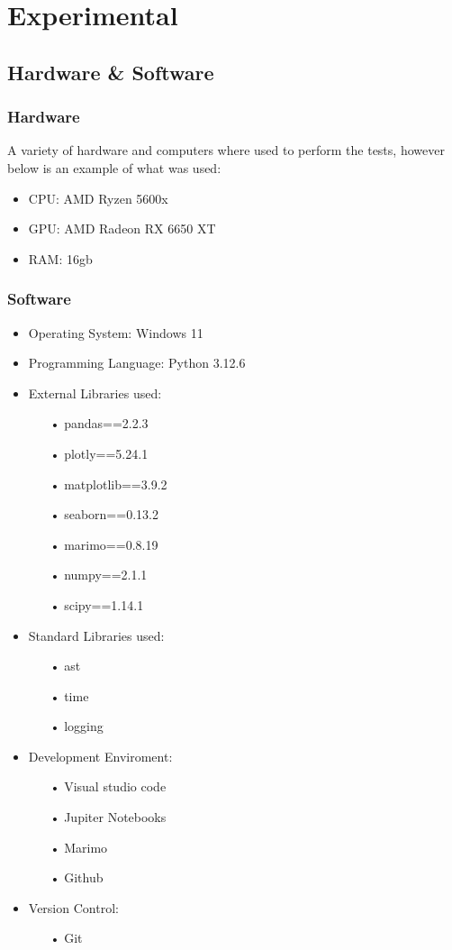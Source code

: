 \section{Experimental}
\subsection{Hardware \& Software}
\subsubsection{Hardware}
A variety of hardware and computers where used to perform the tests, however below is an example of what was used:
\begin{itemize}
    \item CPU: AMD Ryzen 5600x
    \item GPU: AMD Radeon RX 6650 XT
    \item RAM: 16gb
\end{itemize}
\subsubsection{Software}
\begin{itemize}
    \item Operating System: Windows 11
    \item Programming Language: Python 3.12.6
    \item External Libraries used:
    \begin{itemize}
        \item[•] pandas==2.2.3
        \item[•] plotly==5.24.1
        \item[•] matplotlib==3.9.2
        \item[•] seaborn==0.13.2
        \item[•] marimo==0.8.19
        \item[•] numpy==2.1.1
        \item[•] scipy==1.14.1
    \end{itemize}
    \item Standard Libraries used:
    \begin{itemize}
        \item[•] ast
        \item[•] time
        \item[•] logging
    \end{itemize}
    \item Development Enviroment:
    \begin{itemize}
        \item[•] Visual studio code
        \item[•] Jupiter Notebooks
        \item[•] Marimo
        \item[•] Github
    \end{itemize}
    \item Version Control:
    \begin{itemize}
        \item[•] Git
    \end{itemize}
\end{itemize}
